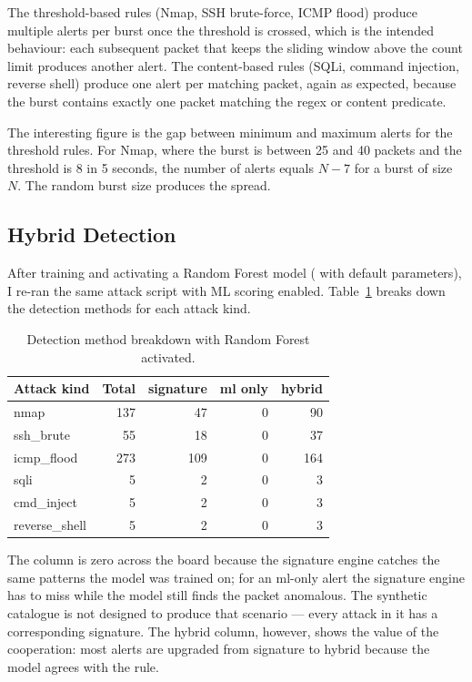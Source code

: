 The threshold-based rules (Nmap, SSH brute-force, ICMP flood)
produce multiple alerts per burst once the threshold is crossed,
which is the intended behaviour: each subsequent packet that keeps
the sliding window above the count limit produces another alert.
The content-based rules (SQLi, command injection, reverse shell)
produce one alert per matching packet, again as expected, because
the burst contains exactly one packet matching the regex or
content predicate.

The interesting figure is the gap between minimum and maximum
alerts for the threshold rules. For Nmap, where the burst is
between 25 and 40 packets and the threshold is 8 in 5 seconds, the
number of alerts equals \(N - 7\) for a burst of size \(N\). The
random burst size produces the spread.

\subsection{Hybrid Detection}
\label{sec:val-hybrid}

After training and activating a Random Forest model
( with default parameters), I re-ran the
same attack script with ML scoring enabled. Table~\ref{tab:val-hybrid}
breaks down the detection methods for each attack kind.

\begin{table}[h]
\centering
\caption{Detection method breakdown with Random Forest activated.}
\label{tab:val-hybrid}
\small
\begin{tabular}{l r r r r}
\toprule
Attack kind     & Total & signature & ml only & hybrid \\
\midrule
nmap            & 137 &  47 & 0 &  90 \\
ssh\_brute      &  55 &  18 & 0 &  37 \\
icmp\_flood     & 273 & 109 & 0 & 164 \\
sqli            &   5 &   2 & 0 &   3 \\
cmd\_inject     &   5 &   2 & 0 &   3 \\
reverse\_shell  &   5 &   2 & 0 &   3 \\
\bottomrule
\end{tabular}
\end{table}

The  column is zero across the board because the
signature engine catches the same patterns the model was trained
on; for an ml-only alert the signature engine has to miss while
the model still finds the packet anomalous. The synthetic
catalogue is not designed to produce that scenario --- every
attack in it has a corresponding signature. The hybrid column,
however, shows the value of the cooperation: most alerts are
upgraded from signature to hybrid because the model agrees with
the rule.

